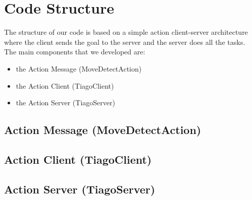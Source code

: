 \section{Code Structure}
The structure of our code is based on a simple action client-server architecture where the client sends the goal to the server and the server does all the tasks. 
The main components that we developed are:
\begin{itemize}
    \item the Action Message (MoveDetectAction)
    \item the Action Client (TiagoClient)
    \item the Action Server (TiagoServer)
\end{itemize}

\subsection{Action Message (MoveDetectAction)}

\subsection{Action Client (TiagoClient)}

\subsection{Action Server (TiagoServer)}

